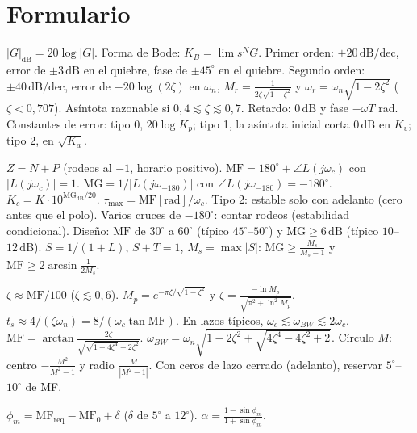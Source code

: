 \documentclass[11pt,a4paper]{article}
\newcommand{\dB}{\,\mathrm{dB}}
\newcommand{\dBdec}{\,\mathrm{dB/dec}}
\newcommand{\MF}{\mathrm{MF}}
\newcommand{\MG}{\mathrm{MG}}
\newcommand{\wc}{\omega_c}
\newcommand{\wf}{\omega_{-180}}
\begin{document}
\section{Formulario}
\label{ap:formulario}
{\small
\begin{tcolorbox}[base,colback=white,colframe=azul,title={Bode}]
$|G|_{\mathrm{dB}}=20\log|G|$. Forma de Bode: $K_B=\lim s^NG$. Primer orden: $\pm20\dBdec$, error de $\pm3\dB$ en el quiebre, fase de $\pm45^\circ$ en el quiebre.
Segundo orden: $\pm40\dBdec$, error de $-20\log(2\zeta)$ en $\omega_n$, $M_r=\frac{1}{2\zeta\sqrt{1-\zeta^2}}$ y $\omega_r=\omega_n\sqrt{1-2\zeta^2}$ ($\zeta<0{,}707$).
Asíntota razonable si $0{,}4\lesssim\zeta\lesssim0{,}7$. Retardo: $0\dB$ y fase $-\omega T$ rad.
Constantes de error: tipo 0, $20\log K_p$; tipo 1, la asíntota inicial corta $0\dB$ en $K_v$; tipo 2, en $\sqrt{K_a}$.
\end{tcolorbox}
\begin{tcolorbox}[base,colback=white,colframe=azul,title={Nyquist y márgenes}]
$Z=N+P$ (rodeos al $-1$, horario positivo). $\MF=180^\circ+\angle L(j\wc)$ con $|L(j\wc)|=1$.
$\MG=1/|L(j\wf)|$ con $\angle L(j\wf)=-180^\circ$. $K_c=K\cdot10^{\MG_{\mathrm{dB}}/20}$. $\tau_{\max}=\MF[\mathrm{rad}]/\wc$.
Tipo 2: estable solo con adelanto (cero antes que el polo). Varios cruces de $-180^\circ$: contar rodeos (estabilidad condicional).
Diseño: $\MF$ de $30^\circ$ a $60^\circ$ (típico $45^\circ$--$50^\circ$) y $\MG\ge6\dB$ (típico $10$--$12\dB$).
$S=1/(1+L)$, $S+T=1$, $M_s=\max|S|$: $\MG\ge\frac{M_s}{M_s-1}$ y $\MF\ge2\arcsin\frac{1}{2M_s}$.
\end{tcolorbox}
\begin{tcolorbox}[base,colback=white,colframe=azul,title={Lazo cerrado y correlación (2.º orden)}]
$\zeta\approx\MF/100$ ($\zeta\lesssim0{,}6$). $M_p=e^{-\pi\zeta/\sqrt{1-\zeta^2}}$ y $\zeta=\frac{-\ln M_p}{\sqrt{\pi^2+\ln^2M_p}}$.
$t_s\approx4/(\zeta\omega_n)=8/(\wc\tan\MF)$. En lazos típicos, $\wc\lesssim\omega_{BW}\lesssim2\wc$.
$\MF=\arctan\frac{2\zeta}{\sqrt{\sqrt{1+4\zeta^4}-2\zeta^2}}$. $\omega_{BW}=\omega_n\sqrt{1-2\zeta^2+\sqrt{4\zeta^4-4\zeta^2+2}}$.
Círculo $M$: centro $-\frac{M^2}{M^2-1}$ y radio $\frac{M}{|M^2-1|}$. Con ceros de lazo cerrado (adelanto), reservar $5^\circ$--$10^\circ$ de MF.
\end{tcolorbox}
\begin{tcolorbox}[base,colback=white,colframe=verde,title={Adelanto: $G_c=K\frac{Ts+1}{\alpha Ts+1}$\,,\ $\alpha<1$}]
$\phi_m=\MF_{\text{req}}-\MF_0+\delta$ ($\delta$ de $5^\circ$ a $12^\circ$). $\alpha=\frac{1-\sin\phi_m}{1+\sin\phi_m}$.

\end{tcolorbox}}
\end{document}
